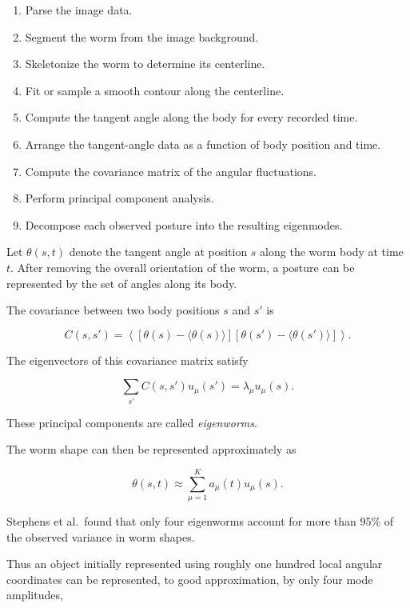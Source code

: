 \begin{enumerate}[start=0]
    \item Parse the image data.
    \item Segment the worm from the image background.
    \item Skeletonize the worm to determine its centerline.
    \item Fit or sample a smooth contour along the centerline.
    \item Compute the tangent angle along the body for every recorded time.
    \item Arrange the tangent-angle data as a function of body position and time.
    \item Compute the covariance matrix of the angular fluctuations.
    \item Perform principal component analysis.
    \item Decompose each observed posture into the resulting eigenmodes.
\end{enumerate}

Let $\theta(s,t)$ denote the tangent angle at position $s$ along the worm body at time $t$.
After removing the overall orientation of the worm, a posture can be represented by the set of angles along its body.

The covariance between two body positions $s$ and $s'$ is

\begin{equation}
    C(s,s')=\left\langle\left[\theta(s)-\langle\theta(s)\rangle\right]\left[\theta(s')-\langle\theta(s')\rangle\right]\right\rangle.
\end{equation}

The eigenvectors of this covariance matrix satisfy

\begin{equation}
    \sum_{s'}C(s,s')u_{\mu}(s')=\lambda_{\mu}u_{\mu}(s).
\end{equation}

These principal components are called \emph{eigenworms}.

The worm shape can then be represented approximately as

\begin{equation}
    \theta(s,t)\approx\sum_{\mu=1}^{K}a_{\mu}(t)u_{\mu}(s).
\end{equation}

Stephens et al.\ found that only four eigenworms account for more than $95\%$ of the observed variance in worm shapes.

Thus an object initially represented using roughly one hundred local angular coordinates can be represented, to good approximation, by only four mode amplitudes,

